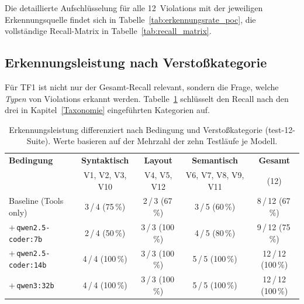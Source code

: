 Die detaillierte Aufschlüsselung für alle 12~Violations mit der jeweiligen Erkennungsquelle findet sich in Tabelle~\ref{tab:erkennungsrate_poc}, die vollständige Recall-Matrix in Tabelle~\ref{tab:recall_matrix}.

\subsection{Erkennungsleistung nach Verstoßkategorie}
\label{sec:recall_kategorie}

Für \acs{TF}1 ist nicht nur der Gesamt-Recall relevant, sondern die Frage, welche \textit{Typen} von Violations erkannt werden. Tabelle~\ref{tab:recall_kategorie} schlüsselt den Recall nach den drei in Kapitel~\ref{Taxonomie} eingeführten Kategorien auf.

\begin{table}[htbp]
\centering
\small
\renewcommand{\arraystretch}{1.15}
\begin{tabular}{@{}lcccc@{}}
\toprule
\textbf{Bedingung} & \textbf{Syntaktisch} & \textbf{Layout} & \textbf{Semantisch} & \textbf{Gesamt} \\
                   & {\small V1, V2, V3, V10} & {\small V4, V5, V12} & {\small V6, V7, V8, V9, V11} & {\small (12)} \\
\midrule
Baseline (Tools only)         & 3\,/\,4 (75\,\%) & 2\,/\,3 (67\,\%) & 3\,/\,5 (60\,\%) & 8\,/\,12 (67\,\%) \\
+\,\texttt{qwen2.5-coder:7b}  & 2\,/\,4 (50\,\%) & 3\,/\,3 (100\,\%) & 4\,/\,5 (80\,\%) & 9\,/\,12 (75\,\%) \\
+\,\texttt{qwen2.5-coder:14b} & 4\,/\,4 (100\,\%) & 3\,/\,3 (100\,\%) & 5\,/\,5 (100\,\%) & 12\,/\,12 (100\,\%) \\
+\,\texttt{qwen3:32b}         & 4\,/\,4 (100\,\%) & 3\,/\,3 (100\,\%) & 5\,/\,5 (100\,\%) & 12\,/\,12 (100\,\%) \\
\bottomrule
\end{tabular}
\caption[Erkennungsleistung nach Bedingung und Verstoßkategorie]{Erkennungsleistung differenziert nach Bedingung und Verstoßkategorie (test-12-Suite). Werte basieren auf der Mehrzahl der zehn Testläufe je Modell.}
\label{tab:recall_kategorie}
\end{table}


